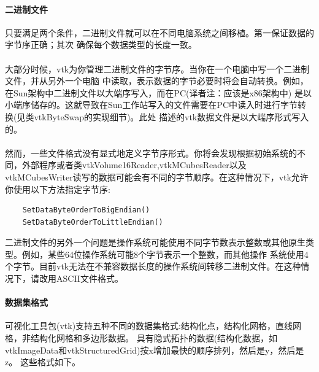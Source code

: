 \documentclass[UTF8]{ctexart}
\begin{document}
\paragraph{二进制文件}只要满足两个条件，二进制文件就可以在不同电脑系统之间移植。第一保证数据的字节序正确；其次
                    确保每个数据类型的长度一致。
\paragraph{\quad}大部分时候，vtk为你管理二进制文件的字节序。当你在一个电脑中写一个二进制文件，并从另外一个电脑
                中读取，表示数据的字节必要时将会自动转换。例如，在Sun架构中二进制文件以大端序写入，而在PC(译者注：应该是x86架构中)
                是以小端序储存的。这就导致在Sun工作站写入的文件需要在PC中读入时进行字节转换(见类vtkByteSwap的实现细节)。此处
                描述的vtk数据文件是以大端序形式写入的。
\paragraph{\quad}然而，一些文件格式没有显式地定义字节序形式。你将会发现根据初始系统的不同，外部程序或者类vtkVolume16Reader,vtkMCubesReader以及
                vtkMCubesWriter读写的数据可能会有不同的字节顺序。在这种情况下，vtk允许你使用以下方法指定字节序:
\begin{verbatim}
    SetDataByteOrderToBigEndian()
    SetDataByteOrderToLittleEndian()
\end{verbatim}
二进制文件的另外一个问题是操作系统可能使用不同字节数表示整数或其他原生类型。例如，某些64位操作系统可能8个字节表示一个整数，而其他操作
系统使用4个字节。目前vtk无法在不兼容数据长度的操作系统间转移二进制文件。在这种情况下，请改用ASCII文件格式。

\paragraph{数据集格式}可视化工具包(vtk)支持五种不同的数据集格式:结构化点，结构化网格，直线网格，非结构化网格和多边形数据。
            具有隐式拓扑的数据(结构化数据，如vtkImageData和vtkStructuredGrid)按x增加最快的顺序排列，然后是y，然后是z。
            这些格式如下。
\end{document}
